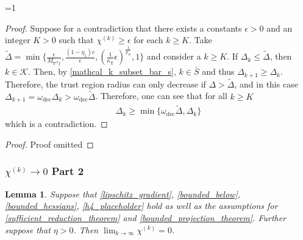 \documentclass{article}
\newtheorem{lemma}[theorem]{Lemma}
\theoremstyle{case}
\newcommand{\dk}{\Delta_k}
\newcommand{\chik}{{\chi^{(k)}}}
\newcommand{\omegadec}{\omega_{\text{dec}}}
\newcommand{\dkpo}{\Delta_{k+1}}
\newcommand{\hfb}{{M_{\nabla^2 f}}}
\def\includeproofs{1}
\begin{document}
\ifnum\includeproofs=1
\begin{proof}
Suppose for a contradiction that there exists a constants $\epsilon > 0$ and an integer $K > 0$ such that $\chik \ge \epsilon$ for each $k \ge K$.
Take $ \tilde \Delta = \min \{\frac{\epsilon}{\hfb}, \frac{(1 - \eta_1)c}{\epsilon}, \left(\frac 1 {\kappa_{\chi}}  \epsilon \right)^{\frac 1 {p_{\Delta}}}, 1\}$
and consider a $k \ge K$.
If $\dk \le \tilde \Delta$, then $k \in \mathcal K$.
Then, by \cref{mathcal_k_subset_bar_s},  $k \in \bar S$ and thus $\dkpo \ge \dk$.
Therefore, the trust region radius can only decrease if $\Delta > \tilde \Delta$, and in this case $\dkpo = \omegadec\dk > \omegadec \tilde \Delta$.
Therefore, one can see that for all $k \ge K$
\begin{align}
\dk \ge \min\{\omegadec \tilde \Delta, \dk \}
\end{align}
which is a contradiction.
\end{proof}
\else
\begin{proof}
Proof omitted
\end{proof}
\fi



\subsubsection{$\chik \to 0$ Part 2}
\begin{lemma}
Suppose that \cref{lipschitz_gradient}, \cref{bounded_below}, \cref{bounded_hessians}, \cref{h4_placeholder} hold as well as the assumptions for \cref{sufficient_reduction_theorem} and \cref{bounded_projection_theorem}.
Further suppose that $\eta > 0$.
Then $\lim_{k\to\infty}\chik=0$.
\end{lemma}
\end{document}
